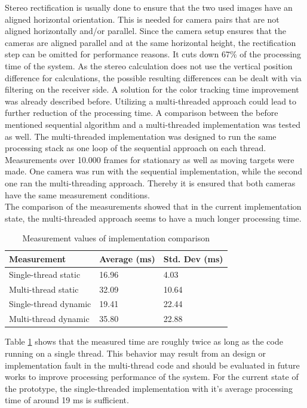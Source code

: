 Stereo rectification is usually done to ensure that the two used images have an aligned horizontal orientation. This is needed for camera pairs that are not aligned horizontally and/or parallel. Since the camera setup ensures that the cameras are aligned parallel and at the same horizontal height, the rectification step can be omitted for performance reasons. It cuts down 67\% of the processing time of the system. As the stereo calculation does not use the vertical position difference for calculations, the possible resulting differences can be dealt with via filtering on the receiver side.
A solution for the color tracking time improvement was already described before. Utilizing a multi-threaded approach could lead to further reduction of the processing time. A comparison between the before mentioned sequential algorithm and a multi-threaded implementation was tested as well. The multi-threaded implementation was designed to run the same processing stack as one loop of the sequential approach on each thread. Measurements over 10.000 frames for stationary as well as moving targets were made. One camera was run with the sequential implementation, while the second one ran the multi-threading approach. Thereby it is ensured that both cameras have the same measurement conditions.\\
The comparison of the measurements showed that in the current implementation state, the multi-threaded approach seems to have a much longer processing time. 
\begin{table}[h]
\centering
\caption{Measurement values of implementation comparison}
\label{tbl:implementaion_comparison}
\begin{tabular}{|l|l|l|}
\hline
Measurement            & Average (ms) & Std. Dev (ms) \\ \hline
Single-thread static  & 16.96        & 4.03          \\ \hline
Multi-thread static   & 32.09        & 10.64         \\ \hline
Single-thread dynamic & 19.41        & 22.44         \\ \hline
Multi-thread dynamic  & 35.80        & 22.88         \\ \hline
\end{tabular}
\end{table}
Table \ref{tbl:implementaion_comparison} shows that the measured time are roughly twice as long as the code running on a single thread. This behavior may result from an design or implementation fault in the multi-thread code and should be evaluated in future works to improve processing performance of the system. For the current state of the prototype, the single-threaded implementation with it's average processing time of around 19 ms is sufficient.

